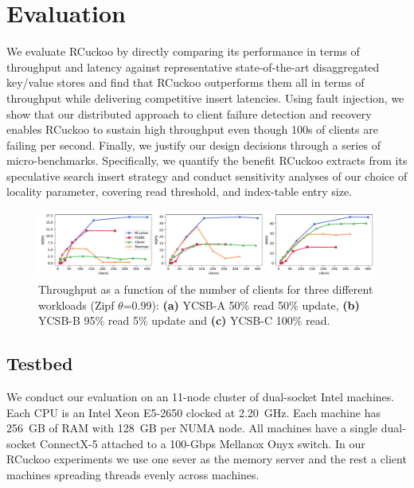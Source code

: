 \section{Evaluation}
\label{sec:eval}

We evaluate RCuckoo by directly comparing its performance in terms of
throughput and latency against representative state-of-the-art
disaggregated key/value stores and find that RCuckoo outperforms them
all in terms of throughput while delivering competitive insert
latencies.  Using fault injection, we show that our distributed
approach to client failure detection and recovery enables RCuckoo to
sustain high throughput even though 100s of clients are failing per
second.  Finally, we justify our design decisions through a series of
micro-benchmarks. Specifically, we quantify the benefit RCuckoo
extracts from its speculative search insert strategy and conduct
sensitivity analyses of our choice of locality parameter, covering
read threshold, and index-table entry size.



\begin{figure}[ht]
    \includegraphics[width=0.99\linewidth]{fig/hero_ycsb_throughput.pdf}

    \caption{Throughput as a function of the number of clients for three different workloads (Zipf $\theta$=0.99): \textbf{(a)} YCSB-A 50\%
    read 50\% update, \textbf{(b)} YCSB-B 95\% read 5\% update and \textbf{(c)}
    YCSB-C 100\% read.}
    \label{fig:ycsb_throughput}
 \end{figure}


\subsection{Testbed}

We conduct our evaluation on an 11-node cluster of dual-socket Intel
machines. Each CPU is an Intel Xeon E5-2650 clocked at
2.20~GHz. Each machine has 256~GB of RAM with 128~GB per NUMA
node. All machines have a single dual-socket ConnectX-5 attached to a
100-Gbps Mellanox Onyx switch. In our RCuckoo experiments we use one
sever as the memory server and the rest a client machines
spreading threads evenly across machines.

